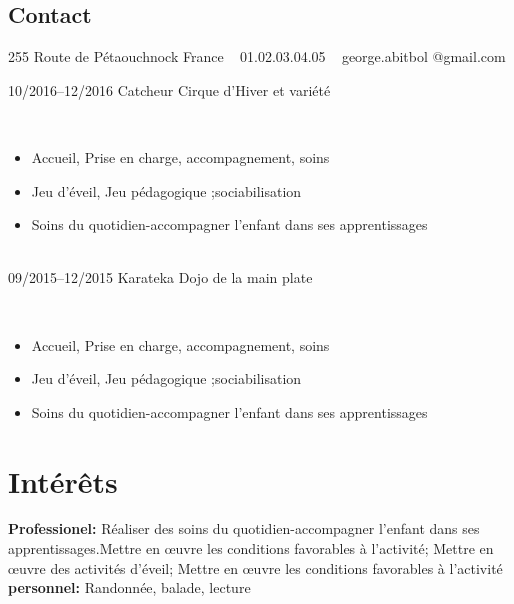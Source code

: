 \documentclass[]{cv-style}          %
\begin{document}
\begin{aside}
\section{Contact}
255 Route de Pétaouchnock
France
~
01.02.03.04.05
~
george.abitbol
@gmail.com
\end{aside}
\begin{entrylist}

\entry
  {10/2016--12/2016}
  {Catcheur}
  {Cirque d'Hiver et variété}
  {\\
  \begin{itemize}
  	\item Accueil, Prise en charge, accompagnement, soins
  	\item Jeu d’éveil, Jeu pédagogique ;sociabilisation
  	\item Soins du quotidien-accompagner l’enfant dans ses apprentissages
  \end{itemize}}\\

\entry
  {09/2015--12/2015}
  {Karateka}
  {Dojo de la main plate}
  {\\
  \begin{itemize}
    \item Accueil, Prise en charge, accompagnement, soins
    \item Jeu d’éveil, Jeu pédagogique ;sociabilisation
    \item Soins du quotidien-accompagner l’enfant dans ses apprentissages
  \end{itemize}}

\end{entrylist}


\section{Intérêts}
  \vspace{-0.1cm}

\textbf{Professionel:} Réaliser des soins du quotidien-accompagner l’enfant dans ses apprentissages.Mettre en œuvre les conditions favorables à l’activité;
Mettre en œuvre des activités d’éveil;
Mettre en œuvre les conditions favorables à l’activité\\
\textbf{personnel:} Randonnée, balade, lecture
\end{document}
